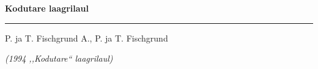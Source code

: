 \documentclass[10pt]{book}
\begin{document}
{
  \samepage
  \raggedbottom
  \raggedright
  \sloppy


  \vspace{0.2in}
    \centerline{
      \bfseries
      \large Kodutare laagrilaul
    }
  \nopagebreak[4]
  \vspace{0.1in}
  \nopagebreak[4]
  \hrule height 0.05ex
  \nopagebreak[4]
  \vspace{-0.05in}

  {\footnotesize P. ja T. Fischgrund \hfill A., P. ja T. Fischgrund }\\
  \vspace{0.01in}

  {\em {\footnotesize (1994 ,,Kodutare{``} laagrilaul) } }
  \vspace{0.01in}


}
\end{document}
